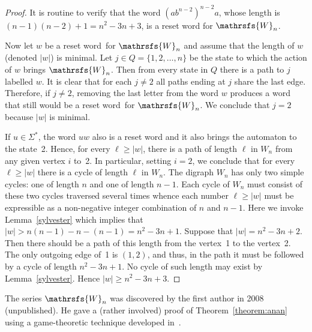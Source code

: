 \documentclass[11pt]{llncs}
\newcommand{\sw}{reset word}
\begin{document}
\begin{proof}
It is routine to verify that the word $(ab^{n-2})^{n-2}a$, whose length
is $(n-1)(n-2)+1=n^2-3n+3$, is a reset word for $\mathrsfs{W}_n$.

Now let $w$ be a \sw\ for $\mathrsfs{W}_n$ and assume that the length
of $w$ (denoted $|w|$) is minimal. Let $j\in Q=\{1,2,\dots,n\}$ be the
state to which the action of $w$ brings $\mathrsfs{W}_n$. Then from
every state in $Q$ there is a path to $j$ labelled $w$. It is clear
that for each $j\ne 2$ all paths ending at $j$ share the last edge.
Therefore, if $j\ne 2$, removing the last letter from the word $w$
produces a word that still would be a \sw\ for $\mathrsfs{W}_n$.
We conclude that $j=2$ because $|w|$ is minimal.

If $u\in\Sigma^*$, the word $uw$ also is a reset word and it also
brings the automaton to the state~2. Hence, for every $\ell\ge|w|$,
there is a path of length $\ell$ in $W_n$ from any given vertex $i$
to~2. In particular, setting $i=2$, we conclude that for every
$\ell\ge|w|$ there is a cycle of length $\ell$ in $W_n$. The digraph
$W_n$ has only two simple cycles: one of length $n$ and one of length $n-1$.
Each cycle of $W_n$ must consist of these two cycles traversed several times
whence each number $\ell\ge|w|$ must be expressible as a non-negative integer
combination of $n$ and $n-1$. Here we invoke Lemma~\ref{sylvester} which
implies that $|w|>n(n-1)-n-(n-1)=n^2-3n+1$. Suppose that $|w|=n^2-3n+2$.
Then there should be a path of this length from the vertex~1 to the vertex~2.
The only outgoing edge of~1 is $(1,2)$, and thus, in the path it must be
followed by a cycle of length $n^2-3n+1$. No cycle of such length may
exist by  Lemma~\ref{sylvester}. Hence $|w|\ge n^2-3n+3$.
\end{proof}

The series $\mathrsfs{W}_n$ was discovered by the first author in 2008
(unpublished). He gave a (rather involved) proof of Theorem~\ref{theorem:anan}
using a game-theoretic technique developed in~\cite{AVZ}.
\end{document}
